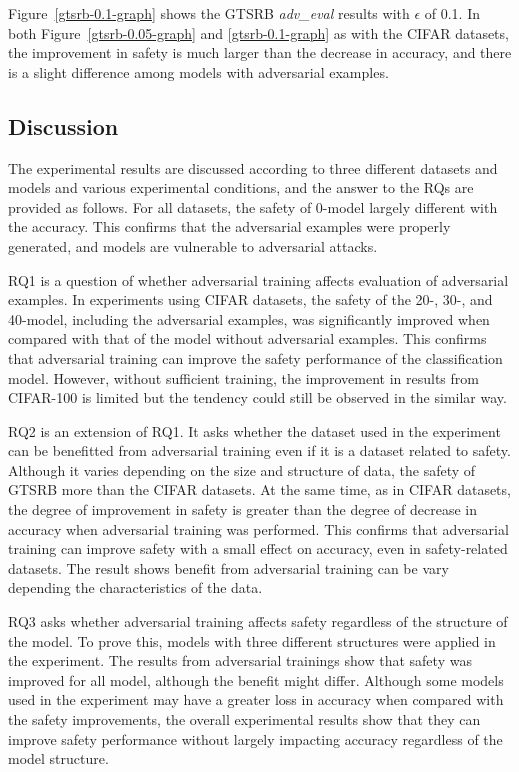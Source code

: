 \documentclass[symmetry,article,submit,moreauthors,pdftex]{Definitions/mdpi}
\begin{document}
Figure~\ref{gtsrb-0.1-graph} shows the GTSRB {\it adv\_eval} results with \begin{math}\epsilon\end{math} of 0.1.
In both Figure~\ref{gtsrb-0.05-graph} and \ref{gtsrb-0.1-graph} as with the CIFAR datasets, the improvement in safety is much larger than the decrease in accuracy, and there is a slight difference among models with adversarial examples.

\subsection{Discussion}

The experimental results are discussed according to three different datasets and models and various experimental conditions, and the answer to the RQs are provided as follows.
For all datasets, the safety of 0-model largely different with the accuracy. This confirms that the adversarial examples were properly generated, and models are vulnerable to adversarial attacks.

RQ1 is a question of whether adversarial training affects evaluation of adversarial examples.
In experiments using CIFAR datasets, the safety of the 20-, 30-, and 40-model, including the adversarial examples, was significantly improved when compared with that of the model without adversarial examples.
This confirms that adversarial training can improve the safety performance of the classification model.
However, without sufficient training, the improvement in results from CIFAR-100 is limited but the tendency could still be observed in the similar way.

RQ2 is an extension of RQ1. It asks whether the dataset used in the experiment can be benefitted from adversarial training even if it is a dataset related to safety.
Although it varies depending on the size and structure of data, the safety of GTSRB more than the CIFAR datasets.
At the same time, as in CIFAR datasets, the degree of improvement in safety is greater than the degree of decrease in accuracy when adversarial training was performed.
This confirms that adversarial training can improve safety with a small effect on accuracy, even in safety-related datasets. The result shows benefit from adversarial training can be vary depending the characteristics of the data. 

RQ3 asks whether adversarial training affects safety regardless of the structure of the model.
To prove this, models with three different structures were applied in the experiment.
The results from adversarial trainings show that safety was improved for all model, although the benefit might differ.
Although some models used in the experiment may have a greater loss in accuracy when compared with the safety improvements, the overall experimental results show that they can improve safety performance without largely impacting accuracy regardless of the model structure.
\end{document}
